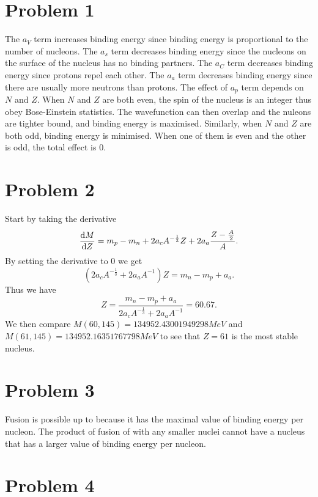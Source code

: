 \documentclass[a4paper]{article}
\title{}
\author{brianShan974}
\date{\today}
\theoremstyle{theorem}
\theoremstyle{definition}
\theoremstyle{lemma}
\theoremstyle{corollary}
\theoremstyle{remark}
\theoremstyle{axiom}
\begin{document}

\section*{Problem 1}

The \(a_V\) term increases binding energy since binding energy is proportional to the number of nucleons.
The \(a_s\) term decreases binding energy since the nucleons on the surface of the nucleus has no binding partners.
The \(a_C\) term decreases binding energy since protons repel each other.
The \(a_a\) term decreases binding energy since there are usually more neutrons than protons.
The effect of \(a_p\) term depends on \(N\) and \(Z\).
When \(N\) and \(Z\) are both even,
the spin of the nucleus is an integer thus obey Bose-Einstein statistics.
The wavefunction can then overlap and the nuleons are tighter bound,
and binding energy is maximised.
Similarly,
when \(N\) and \(Z\) are both odd,
binding energy is minimised.
When one of them is even and the other is odd,
the total effect is 0.

\section*{Problem 2}

Start by taking the derivative
\[
  \derivative{M}{Z} = m_p - m_n + 2a_cA^{-\frac{1}{3}}Z + 2a_a\frac{Z - \frac{A}{2}}{A}
.\]
By setting the derivative to \(0\) we get
\[
  (2a_cA^{-\frac{1}{3}} + 2a_aA^{-1})Z = m_n - m_p + a_a
.\]
Thus we have
\[
  Z = \frac{m_n - m_p + a_a}{2a_cA^{-\frac{1}{3}} + 2a_aA^{-1}} = 60.67
.\]
We then compare \(M(60, 145) = 134952.43001949298\si{MeV}\) and \(M(61, 145) = 134952.16351767798\si{MeV}\) to see that \(Z = 61\) is the most stable nucleus.

\section*{Problem 3}

Fusion is possible up to  because it has the maximal value of binding energy per nucleon.
The product of fusion of  with any smaller nuclei cannot have a nucleus that has a larger value of binding energy per nucleon.

\section*{Problem 4}
\end{document}
